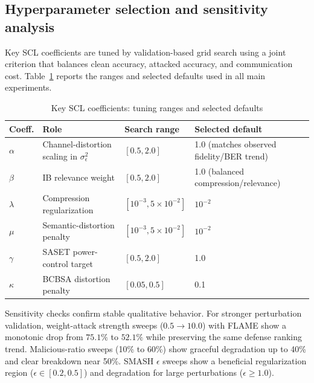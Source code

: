 \documentclass[10pt,journal]{IEEEtran}
\begin{document}
\subsection{Hyperparameter selection and sensitivity analysis}
Key SCL coefficients are tuned by validation-based grid search using a joint criterion that balances clean accuracy, attacked accuracy, and communication cost. Table~\ref{tab:coeff_tuning} reports the ranges and selected defaults used in all main experiments.
\begin{table}[htbp]
\centering
\caption{Key SCL coefficients: tuning ranges and selected defaults}
\label{tab:coeff_tuning}
\footnotesize
\setlength{\tabcolsep}{4pt}
\begin{tabular}{p{}p{}p{}p{}}
\toprule
\textbf{Coeff.} & \textbf{Role} & \textbf{Search range} & \textbf{Selected default} \\
\midrule
$\alpha$ & Channel-distortion scaling in $\sigma_\epsilon^2$ & $[0.5,2.0]$ & 1.0 (matches observed fidelity/BER trend) \\
$\beta$ & IB relevance weight & $[0.5,2.0]$ & 1.0 (balanced compression/relevance) \\
$\lambda$ & Compression regularization & $[10^{-3},5\times10^{-2}]$ & $10^{-2}$ \\
$\mu$ & Semantic-distortion penalty & $[10^{-3},5\times10^{-2}]$ & $10^{-2}$ \\
$\gamma$ & SASET power-control target & $[0.5,2.0]$ & 1.0 \\
$\kappa$ & BCBSA distortion penalty & $[0.05,0.5]$ & 0.1 \\
\bottomrule
\end{tabular}
\end{table}
Sensitivity checks confirm stable qualitative behavior. For stronger perturbation validation, weight-attack strength sweeps ($0.5\rightarrow10.0$) with FLAME show a monotonic drop from $75.1\%$ to $52.1\%$ while preserving the same defense ranking trend. Malicious-ratio sweeps (10\% to 60\%) show graceful degradation up to 40\% and clear breakdown near 50\%. SMASH $\epsilon$ sweeps show a beneficial regularization region ($\epsilon\in[0.2,0.5]$) and degradation for large perturbations ($\epsilon\ge1.0$).
\end{document}

